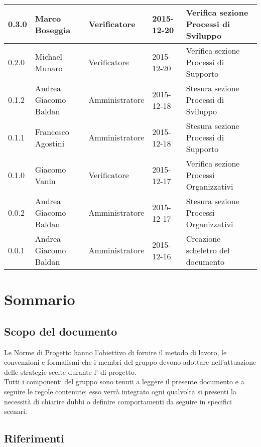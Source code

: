 \documentclass{scalatekids-article}
\begin{document}
\begin{center}
\begin{tabular}{| l | l | l | l | l |}
        \hline
        0.3.0 & Marco Boseggia & Verificatore & 2015-12-20 & Verifica sezione Processi di Sviluppo\\
        \hline
        0.2.0 & Michael Munaro & Verificatore & 2015-12-20 & Verifica sezione Processi di Supporto\\
        \hline
        0.1.2 & Andrea Giacomo Baldan & Amministratore & 2015-12-18 & Stesura sezione Processi di Sviluppo\\
        \hline
        0.1.1 & Francesco Agostini & Amministratore & 2015-12-18 & Stesura sezione Processi di Supporto\\
        \hline
        0.1.0 & Giacomo Vanin & Verificatore & 2015-12-17 & Verifica sezione Processi Organizzativi\\
        \hline
        0.0.2 & Andrea Giacomo Baldan & Amministratore & 2015-12-17 & Stesura sezione Processi Organizzativi\\
        \hline
        0.0.1 & Andrea Giacomo Baldan & Amministratore & 2015-12-16 & Creazione scheletro del documento\\
        \hline
    \end{tabular}
\end{center}
\tableofcontents
\newpage
{}

\section{Sommario}

\subsection{Scopo del documento}

Le Norme di Progetto hanno l'obiettivo di fornire il metodo di lavoro, le
convenzioni e formalismi che i membri del gruppo devono adottare nell'attuazione
delle strategie scelte durante l' di progetto. \\
Tutti i componenti del gruppo sono tenuti a leggere il presente documento e a seguire
le regole contenute; esso verrà integrato ogni qualvolta si presenti la necessità di
chiarire dubbi o definire comportamenti da seguire in specifici scenari.

\prodPurpose
\glossExpl

\subsection{Riferimenti}
\end{document}
